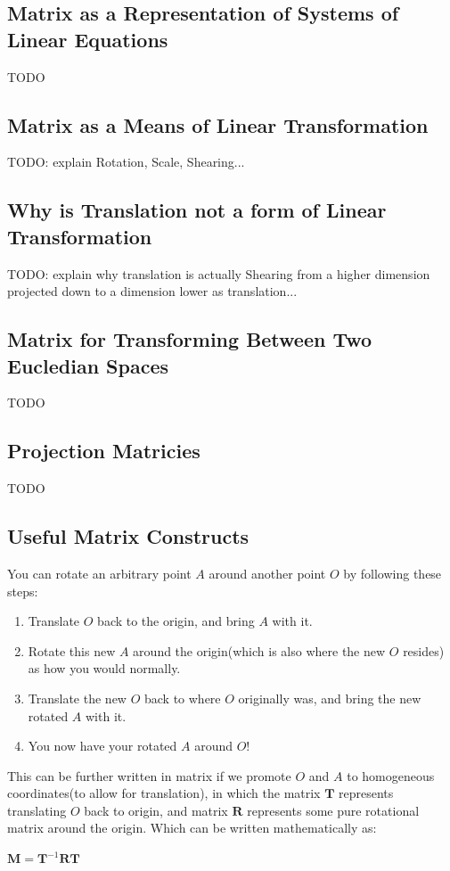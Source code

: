 \subsection{Matrix as a Representation of Systems of Linear Equations}
TODO

\subsection{Matrix as a Means of Linear Transformation}
TODO: explain Rotation, Scale, Shearing...

\subsection{Why is Translation not a form of Linear Transformation}
TODO: explain why translation is actually Shearing from a higher dimension projected down
to a dimension lower as translation...

\subsection{Matrix for Transforming Between Two Eucledian Spaces}
TODO

\subsection{Projection Matricies}
TODO

\subsection{Useful Matrix Constructs}
You can rotate an arbitrary point $A$ around another point $O$ by following these steps:
\begin{enumerate}
    \item Translate $O$ back to the origin, and bring $A$ with it.
    \item Rotate this new $A$ around the origin(which is also where the new $O$ resides)
        as how you would normally.
    \item Translate the new $O$ back to where $O$ originally was, and bring the new rotated $A$ with it.
    \item You now have your rotated $A$ around $O$!
\end{enumerate}

This can be further written in matrix if we promote $O$ and $A$ to homogeneous coordinates(to allow for translation),
in which the matrix $\textbf{T}$ represents translating $O$ back to origin, and matrix $\textbf{R}$ represents
some pure rotational matrix around the origin. Which can be written mathematically as:
\begin{center}
    $\textbf{M}=\textbf{T}^{-1}\textbf{R}\textbf{T}$
\end{center}

